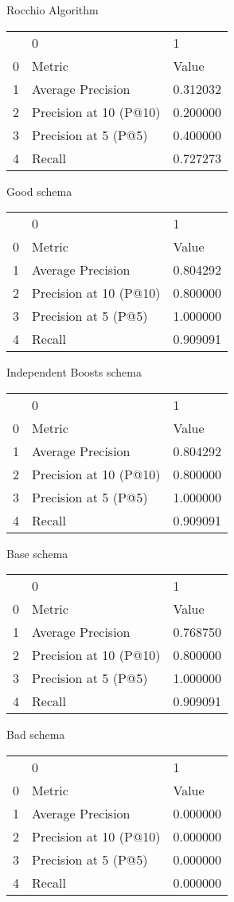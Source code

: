 

Rocchio Algorithm
\begin{tabular}{lll}
 & 0 & 1 \\
0 & Metric & Value \\
1 & Average Precision & 0.312032 \\
2 & Precision at 10 (P@10) & 0.200000 \\
3 & Precision at 5 (P@5) & 0.400000 \\
4 & Recall & 0.727273 \\
\end{tabular}


Good schema
\begin{tabular}{lll}
 & 0 & 1 \\
0 & Metric & Value \\
1 & Average Precision & 0.804292 \\
2 & Precision at 10 (P@10) & 0.800000 \\
3 & Precision at 5 (P@5) & 1.000000 \\
4 & Recall & 0.909091 \\
\end{tabular}


Independent Boosts schema
\begin{tabular}{lll}
 & 0 & 1 \\
0 & Metric & Value \\
1 & Average Precision & 0.804292 \\
2 & Precision at 10 (P@10) & 0.800000 \\
3 & Precision at 5 (P@5) & 1.000000 \\
4 & Recall & 0.909091 \\
\end{tabular}


Base schema
\begin{tabular}{lll}
 & 0 & 1 \\
0 & Metric & Value \\
1 & Average Precision & 0.768750 \\
2 & Precision at 10 (P@10) & 0.800000 \\
3 & Precision at 5 (P@5) & 1.000000 \\
4 & Recall & 0.909091 \\
\end{tabular}


Bad schema
\begin{tabular}{lll}
 & 0 & 1 \\
0 & Metric & Value \\
1 & Average Precision & 0.000000 \\
2 & Precision at 10 (P@10) & 0.000000 \\
3 & Precision at 5 (P@5) & 0.000000 \\
4 & Recall & 0.000000 \\
\end{tabular}
